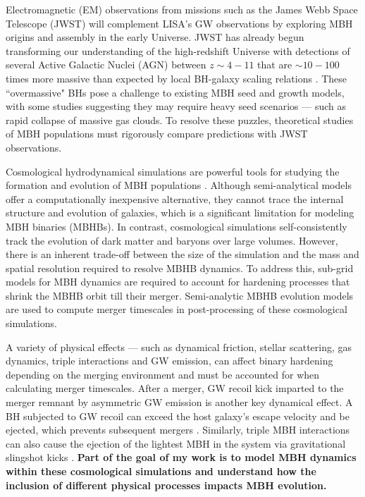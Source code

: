 \documentclass[11pt, letterpaper]{article}
\begin{document}
Electromagnetic (EM) observations from missions such as the James Webb Space Telescope (JWST) will complement LISA's GW observations by exploring MBH origins and assembly in the early Universe. JWST has already begun transforming our understanding of the high-redshift Universe with detections of several Active Galactic Nuclei (AGN) between $z \sim 4-11$ that are $\sim 10-100$ times more massive than expected by local BH-galaxy scaling relations \cite{Larson_2023, harikane2023jwstnirspeccensusbroadlineagns, matthee2024littlereddotsabundant, goulding2023uncovergrowthmassiveblack}. These ``overmassive" BHs pose a challenge to existing MBH seed and growth models, with some studies \cite{Pacucci_2023,natarajan2023detectionovermassiveblackhole} suggesting they may require heavy seed scenarios — such as rapid collapse of massive gas clouds. To resolve these puzzles, theoretical studies of MBH populations must rigorously compare predictions with JWST observations.


Cosmological hydrodynamical simulations are powerful tools for studying the formation and evolution of MBH populations \cite{HorizonAGN2014,2015Illustris,2015Eagle,nelson2021illustristngsimulationspublicdata}. Although semi-analytical models \cite{Sesana_2011,Barausse_2012, Klein_2016,Dayal_2019,bonetti_post-newtonian_2019, Valiante_2020} offer a computationally inexpensive alternative, they cannot trace the internal structure and evolution of galaxies, which is a significant limitation
for modeling MBH binaries (MBHBs). In contrast, cosmological simulations self-consistently track the evolution of dark matter and baryons over large volumes.  However, there is an inherent trade-off between the size of the simulation and the mass and spatial resolution required to resolve MBHB dynamics. To address this, sub-grid models for MBH dynamics are required to account for hardening processes that shrink the MBHB orbit till their merger. Semi-analytic MBHB evolution models are used to compute merger timescales in post-processing of these cosmological simulations. 


A variety of physical effects — such as dynamical friction, stellar scattering, gas dynamics, triple interactions and GW emission, can affect binary hardening depending on the merging environment and must be accounted for when calculating merger timescales. After a merger, GW recoil kick imparted to the merger remnant by asymmetric GW emission \cite{Bekenstein1973} is another key dynamical effect. A BH subjected to GW recoil can exceed the host galaxy’s escape velocity and be ejected, which prevents subsequent mergers \cite{volonteri_gravitational_2007,Gerosa_2014,Blecha2016,sayeb_massive_2021}. Similarly, triple MBH interactions can also cause the ejection of the lightest MBH in the system via gravitational slingshot kicks \cite{volonteri_assembly_2003}. \textbf{Part of the goal of my work is to model MBH dynamics within these cosmological simulations and understand how the inclusion of different physical processes impacts MBH evolution.}
\end{document}
